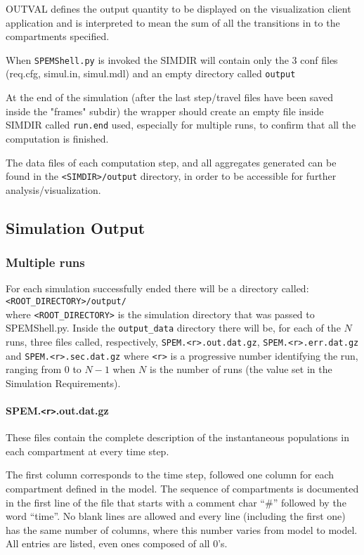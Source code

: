 \documentclass[a4paper, 11pt, fleqn]{paper}
\begin{document}
OUTVAL defines the output quantity to be displayed on the visualization
client application and is interpreted to mean the sum of all the transitions in to the compartments specified.

When \texttt{SPEMShell.py} is invoked the SIMDIR will contain
only the 3 conf files (req.cfg, simul.in, simul.mdl) and an empty
directory called \texttt{output}

At the end of the simulation (after the last step/travel files have
been saved inside the "frames" subdir) the wrapper should create an
empty file inside SIMDIR called \texttt{run.end}
used, especially for multiple runs, to confirm that all
the computation is finished.

The data files of each computation step, and all aggregates generated can be
found in the \texttt{<SIMDIR>/output} directory, in order to be
accessible for further analysis/visualization.

\subsection{Simulation Output}
\subsubsection*{Multiple runs}
For each simulation successfully ended there will be a directory called:\\

\texttt{<ROOT\_DIRECTORY>/output/}\\

\noindent
where \texttt{<ROOT\_DIRECTORY>} is the simulation directory that was passed to SPEMShell.py.
Inside the \texttt{output\_data} directory there will be, for each of the  $N$ runs, three files called, respectively, \texttt{SPEM.<r>.out.dat.gz},  \texttt{SPEM.<r>.err.dat.gz}  and \texttt{SPEM.<r>.sec.dat.gz} where \texttt{<r>} is a progressive number identifying the run, ranging from $0$ to $N-1$ when $N$ is the number of runs (the value set in the Simulation Requirements).

\paragraph*{SPEM.\texttt{<r>}.out.dat.gz}

These files contain the complete description of the instantaneous populations in each compartment at every time step.

The first column corresponds to the time step, followed one column for each compartment defined in the model. The sequence of compartments is documented in the first line of the file that starts with a comment char ``\#'' followed by the word ``time''. No blank lines are allowed and every line (including the first one) has the same number of columns, where this number varies from model to model. All entries are listed, even ones composed of all $0$'s. 
\end{document}

